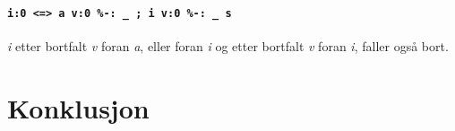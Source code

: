 \documentclass{article}
\begin{document}
\paragraph{\texttt{i:0 <=> a v:0 \%-: \_ ; i v:0 \%-: \_ s}} \emph{i} etter
bortfalt \emph{v} foran \emph{a}, eller foran \emph{i} og etter bortfalt
\emph{v} foran \emph{i}, faller ogs\aa{} bort.


\section{Konklusjon} %

\clearpage

{}
\end{document}
